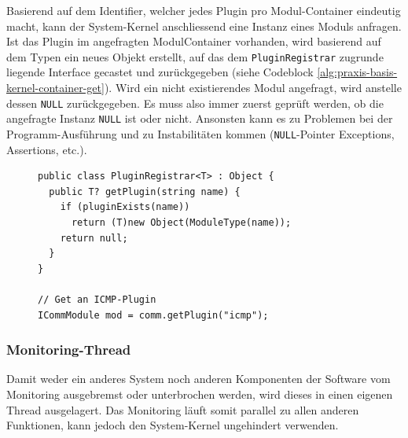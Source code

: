 Basierend auf dem Identifier, welcher jedes Plugin pro Modul-Container eindeutig macht, kann der System-Kernel anschliessend eine Instanz eines Moduls anfragen. Ist das Plugin im angefragten ModulContainer vorhanden, wird basierend auf dem Typen ein neues Objekt erstellt, auf das dem \texttt{PluginRegistrar} zugrunde liegende Interface gecastet und zur\"uckgegeben (siehe Codeblock \ref{alg:praxis-basis-kernel-container-get}). Wird ein nicht existierendes Modul angefragt, wird anstelle dessen \texttt{NULL} zur\"uckgegeben. Es muss also immer zuerst gepr\"uft werden, ob die angefragte Instanz \texttt{NULL} ist oder nicht. Ansonsten kann es zu Problemen bei der Programm-Ausf\"uhrung und zu Instabilit\"aten kommen (\texttt{NULL}-Pointer Exceptions, Assertions, etc.).

\begin{figure}[h]
 \lstset{language=[ISO]C++}
 \begin{lstlisting}[label=alg:praxis-basis-kernel-container-get,caption={[Erstellen einer neuen Instanz eines Moduls]Nachdem alle Module geladen worden sind, kann ein Modul \"uber die Funktion \texttt{getPlugin(string name)} angefordert werden. Existiert ein Plugin mit dem Identifier \texttt{name}, wird eine Instanz von diesem zur\"uckgegeben. Vor der R\"uckgabe wird das neu erstellte Objekt auf das dem PluginRegistrar zugrundegelegte Interface gecastet.}]
public class PluginRegistrar<T> : Object {
  public T? getPlugin(string name) {
    if (pluginExists(name))
      return (T)new Object(ModuleType(name));
    return null;
  }
}

// Get an ICMP-Plugin
ICommModule mod = comm.getPlugin("icmp");
 \end{lstlisting}
\end{figure}

\subsubsection{Monitoring-Thread} \label{sec:praxis-basis-kernel-monitor}
Damit weder ein anderes System noch anderen Komponenten der Software vom Monitoring ausgebremst oder unterbrochen werden, wird dieses in einen eigenen Thread ausgelagert. Das Monitoring l\"auft somit parallel zu allen anderen Funktionen, kann jedoch den System-Kernel ungehindert verwenden.

